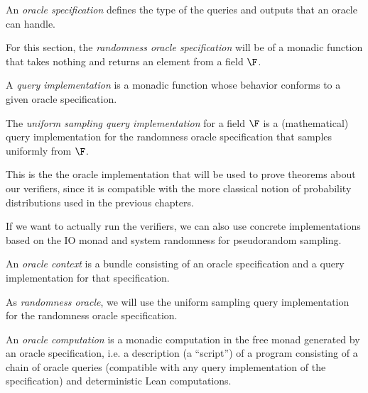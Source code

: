 \begin{definition}
\label{OracleSpec}
\leanok
An \emph{oracle specification} defines the type of the queries and outputs that an oracle can handle.
\end{definition}

\begin{definition}
\label{randOracleSpec}
\leanok
For this section, the \emph{randomness oracle specification} will be of a monadic function that takes
nothing and returns an element from a field \(\F\).
\end{definition}

\begin{definition}
\label{QueryImpl}
\leanok
A \emph{query implementation} is a monadic function whose behavior conforms to a given oracle specification.
\end{definition}

\begin{definition}
\label{uniformSample}
\leanok
The \emph{uniform sampling query implementation} for a field \(\F\) is a (mathematical) 
query implementation for the randomness oracle specification that samples uniformly from \(\F\).
\end{definition}
This is the the oracle implementation that will be used to prove theorems about our verifiers,
since it is compatible with the more classical notion of probability distributions used in the previous chapters.
\begin{remark}
If we want to actually run the verifiers, we can also use concrete implementations based on the IO monad
and system randomness for pseudorandom sampling.
\end{remark}
\begin{definition}
\label{OracleContext}
\leanok
An \emph{oracle context} is a bundle consisting of an oracle specification and a query implementation for that specification.
\end{definition}
\begin{definition}
\label{randOracle}
 \leanok
As \emph{randomness oracle}, we will use the {uniform sampling query implementation} for the randomness oracle specification.
\end{definition}
\begin{definition}
\label{OracleComp}
\leanok
An \emph{oracle computation} is a monadic computation in the free monad generated by an oracle specification,
i.e. a description (a ``script'') of a program consisting of a chain of oracle queries (compatible with any query implementation of the specification)
and deterministic Lean computations.
\end{definition}

